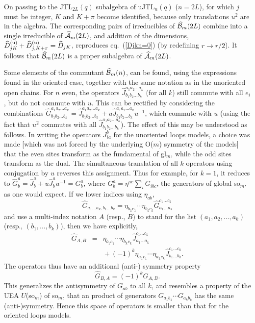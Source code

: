 \documentclass[twocolumn,floats,pra]{revtex4}
\def \hcA {\widehat{\cal A}}
\newcommand {\be}{\begin{equation}}
\newcommand {\ee} {\end{equation}}
\newcommand {\bea}{\begin{eqnarray}}
\newcommand {\eea} {\end{eqnarray}}
\begin{document}
On passing to the JTL$_{2L}(q)$ subalgebra of uJTL$_n(q)$
($n=2L$), for which $j$ must be integer, $K$ and $K+\pi$ become
identified, because only translations $u^2$ are in the algebra.
The corresponding pairs of irreducibles of $\widehat{\cal
B}_m(2L)$ combine into a single irreducible of $\hcA_m(2L)$, and
addition of the dimensions, $\widehat{D}^{({\rm
u})}_{jK}+\widehat{D}^{({\rm u})}_{j,K+\pi}=\widehat{D}_{jK}$,
reproduces eq.\ (\ref{Djkn=0}) (by redefining $r\to r/2$). It
follows that $\widehat{\cal B}_m(2L)$ is a proper subalgebra of
$\hcA_m(2L)$.

Some elements of the commutant $\widehat{\cal B}_m(n)$, can be
found, using the expressions found in the oriented case, together
with the same notation as in the unoriented open chains. For $n$
even, the operators $\widehat{J}^{a_1a_2\ldots a_k}_{b_1b_2\ldots
b_k}$ (for all $k$) still commute with all $e_i$, but do not
commute with $u$. This can be rectified by considering the
combinations $\widehat{G}^{a_1a_2\ldots a_k}_{b_1b_2\ldots
b_k}=\widehat{J}^{a_1a_2\ldots a_k}_{b_1b_2\ldots
b_k}+u\widehat{J}^{a_1a_2\ldots a_k}_{b_1b_2\ldots b_k}u^{-1}$,
which commute with $u$ (using the fact that $u^2$ commutes with
all $\widehat{J}^{a_1a_2\ldots a_k}_{b_1b_2\ldots b_k}$). The
effect of this may be understood as follows. In writing the
operators $J_{ia}^b$ for the unoriented loops models, a choice was
made [which was not forced by the underlying O($m$) symmetry of
the models] that the even sites transform as the fundamental of
gl$_m$, while the odd sites transform as the dual. The
simultaneous translation of all $k$ operators using conjugation by
$u$ reverses this assignment. Thus for example, for $k=1$, it
reduces to $\widehat{G}^a_b=
\widehat{J}^a_b+u\widehat{J}^a_bu^{-1}=G^a_b$, where
$G^a_b=\eta^{ac}\sum_iG_{ibc}$, the generators of global so$_m$,
as one would expect. If we lower indices using $\eta_{ab}$, %
\be%
\widehat{G}_{a_1\ldots a_k,b_1\ldots b_k}=\eta_{b_1c_1}\cdots
\eta_{b_kc_k} \widehat{G}^{c_1\ldots c_k}_{a_1\ldots
a_k}\ee%
and use a multi-index notation $A$ (resp., $B$) to stand for the
list $(a_1,a_2,\ldots,a_k)$ (resp., $(b_1, \ldots, b_k)$), then we
have explicitly,%
\bea%
\widehat{G}_{A,B}&=&\eta_{b_1c_1}\cdots \eta_{b_kc_k}
\widehat{J}^{c_1\ldots c_k}_{a_1\ldots a_k}\nonumber\\&&{}+(-1)^k
\eta_{a_1c_1}\cdots \eta_{a_kc_k} \widehat{J}^{c_1\ldots
c_k}_{b_1\ldots b_k}.\eea%
The operators thus have an additional (anti-) symmetry property%
\be%
\widehat{G}_{B,A}=(-1)^k \widehat{G}_{A,B}.\label{ansym}\ee%
This generalizes the antisymmetry of $G_{ab}$ to all $k$, and
resembles a property of the UEA $U$(so$_m$) of so$_m$, that an
product of generators $G_{a_1b_1}\cdots G_{a_kb_k}$ has the same
(anti-)symmetry. Hence this space of operators is smaller than
that for the oriented loops models.
\end{document}
